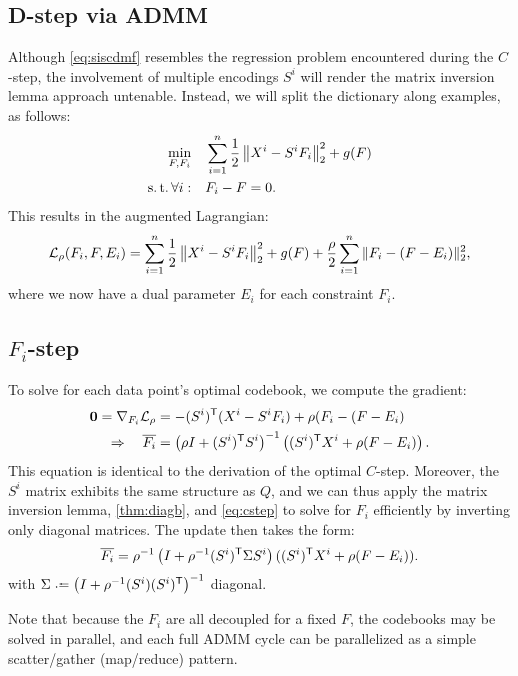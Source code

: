 \documentclass{article}
\begin{document}
\subsection{D-step via ADMM}
Although \autoref{eq:siscdmf} resembles the regression problem encountered during the $C$-step, the involvement of multiple encodings $S^i$ will render the matrix inversion lemma approach
untenable.  Instead, we will split the dictionary along examples, as follows:
\begin{align}
\min_{F, F_i} \quad& \sum_{i=1}^n \frac{1}{2} \left\|X^i - S^i F_i\right\|_2^2 + g(F)\\
\operatorname{s.t.} \forall i: \quad & F_i - F = 0 \notag.
\end{align}
This results in the augmented Lagrangian:
\[
\mathcal{L}_\rho(F_i, F, E_i) = \sum_{i=1}^n \frac{1}{2} \left\|X^i - S^i F_i\right\|_2^2 + g(F) + \frac{\rho}{2}\sum_{i=1}^n \|F_i - (F - E_i)\|_2^2,
\]
where we now have a dual parameter $E_i$ for each constraint $F_i$.

\subsection{$F_i$-step}
To solve for each data point's optimal codebook, we compute the gradient:
\begin{align*}
\mathbf{0} = \nabla_{F_i}\mathcal{L}_\rho &= -(S^i)^\mathsf{T} (X^i - S^i F_i) + \rho(F_i - (F - E_i)\\
\Rightarrow\quad \overline{F_i} &= \left(\rho I + (S^i)^\mathsf{T} S^i \right)^{-1} \left((S^i)^\mathsf{T} X^i + \rho (F - E_i) \right).
\end{align*}
This equation is identical to the derivation of the optimal $C$-step.  Moreover, the $S^i$ matrix exhibits the same structure as $Q$, and we can thus apply the matrix inversion lemma, 
\autoref{thm:diagb}, and \autoref{eq:cstep} to solve for $F_i$ efficiently by inverting only diagonal matrices.  The update then takes the form:
\begin{align}
\overline{F_i} = \rho^{-1}\left( I + \rho^{-1} (S^i)^\mathsf{T} \Sigma S^i\right) ((S^i)^\mathsf{T} X^i + \rho(F-E_i)).\label{eq:fistep}
\end{align}
with $\Sigma \defeq \left(I + \rho^{-1} (S^i) (S^i)\trans\right)^{-1}$ diagonal.

Note that because the $F_i$ are all decoupled for a fixed $F$, the codebooks may be solved in parallel, and each full ADMM cycle can be parallelized as a simple scatter/gather (map/reduce)
pattern.
\end{document}

